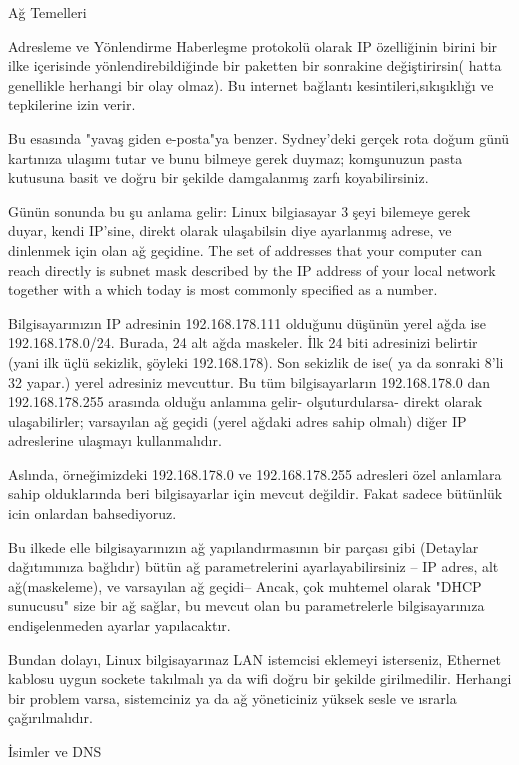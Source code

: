 \begin{section}{Ağ Temelleri}
\begin{subsection}{Adresleme ve Yönlendirme}
Haberleşme protokolü olarak IP özelliğinin birini bir ilke içerisinde yönlendirebildiğinde bir paketten bir sonrakine değiştirirsin( hatta genellikle herhangi bir olay olmaz). Bu internet bağlantı kesintileri,sıkışıklığı ve tepkilerine izin verir.

Bu esasında "yavaş giden e-posta"ya benzer. Sydney'deki gerçek rota doğum günü kartınıza ulaşımı tutar ve bunu bilmeye gerek duymaz; komşunuzun pasta kutusuna basit ve doğru bir şekilde damgalanmış zarfı koyabilirsiniz.

Günün sonunda bu şu anlama gelir: Linux bilgiasayar 3 şeyi bilemeye gerek duyar, kendi IP'sine, direkt olarak ulaşabilsin diye ayarlanmış adrese, ve dinlenmek için olan ağ geçidine. The set of addresses that your computer can reach directly is
subnet mask described by the IP address of your local network together with a which today is most commonly specified as a number.

Bilgisayarınızın IP adresinin 192.168.178.111 olduğunu düşünün yerel ağda ise 192.168.178.0/24. Burada, 24 alt ağda maskeler. İlk 24 biti adresinizi belirtir (yani ilk üçlü sekizlik, şöyleki 192.168.178). Son sekizlik de ise( ya da sonraki 8'li 32 yapar.) yerel adresiniz mevcuttur. Bu tüm bilgisayarların 192.168.178.0 dan 192.168.178.255 arasında olduğu anlamına gelir- olşuturdularsa- direkt olarak ulaşabilirler; varsayılan ağ geçidi (yerel ağdaki adres sahip olmalı) diğer IP adreslerine ulaşmayı kullanmalıdır. 

Aslında, örneğimizdeki 192.168.178.0 ve 192.168.178.255 adresleri özel anlamlara sahip olduklarında beri bilgisayarlar için mevcut değildir. Fakat sadece bütünlük icin onlardan bahsediyoruz.

Bu ilkede elle bilgisayarınızın ağ yapılandırmasının bir parçası gibi (Detaylar dağıtımınıza bağlıdır) bütün ağ parametrelerini ayarlayabilirsiniz -- IP adres, alt ağ(maskeleme), ve varsayılan ağ geçidi-- Ancak, çok muhtemel olarak "DHCP sunucusu" size bir ağ sağlar, bu mevcut olan bu parametrelerle bilgisayarınıza endişelenmeden ayarlar yapılacaktır.

Bundan dolayı, Linux bilgisayarınaz LAN istemcisi eklemeyi isterseniz, Ethernet kablosu uygun sockete takılmalı ya da wifi doğru bir şekilde girilmedilir. Herhangi bir problem varsa, sistemciniz ya da ağ yöneticiniz yüksek sesle ve ısrarla çağırılmalıdır.

\end{subsection}
\begin{subsection}{İsimler ve DNS}


\end{subsection}
\end{section}
